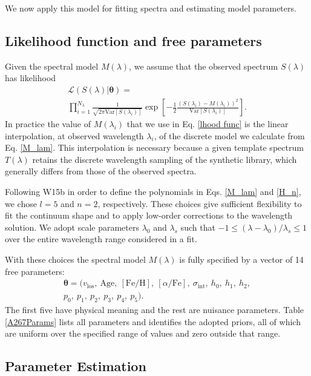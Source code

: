 \documentclass[twocolumn]{aastex6}
\def\feh{\mathrm{[Fe/H]}}
\def\afe{[\alpha/\mathrm{Fe}]}
\def\age{\mathrm{Age}}
\def\vlos{v_\mathrm{los}}
\def\disp{\sigma_\mathrm{int}}
\begin{document}
We now apply this model for fitting spectra and estimating model parameters.

\subsection{Likelihood function and free parameters}
\label{lhood}

Given the spectral model $M(\lambda)$, we assume that the observed spectrum $S(\lambda)$ has likelihood
\begin{multline}
\label{lhood func}
\mathcal{L}\left(S(\lambda)|\bm{\theta}\right)=\\
\prod^{N_\lambda}_{i=1}\frac{1}{\sqrt{2\pi\mathrm{Var}\left[S(\lambda_i)\right]}}\exp{\left[-\frac12\frac{\left(S(\lambda_i)-M(\lambda_i)\right)^2}{\mathrm{Var}\left[S(\lambda_i)\right]}\right]}.
\end{multline}
In practice the value of $M(\lambda_i)$ that we use in Eq. \ref{lhood func} is the linear interpolation, at observed wavelength $\lambda_i$, of the discrete model we calculate from Eq. \ref{M_lam}.
This interpolation is necessary because a given template spectrum $T(\lambda)$ retains the discrete wavelength sampling of the synthetic library, which generally differs from those of the observed spectra.

Following W15b in order to define the polynomials in Eqs. \ref{M_lam} and \ref{H_n}, we chose $l=5$ and $n=2$, respectively.
These choices give sufficient flexibility to fit the continuum shape and to apply low-order corrections to the wavelength solution.
We adopt scale parameters $\lambda_0$ and $\lambda_s$ such that $-1\le(\lambda-\lambda_0)/\lambda_s\le1$ over the entire wavelength range considered in a fit.

With these choices the spectral model $M(\lambda)$ is fully specified by a vector of 14 free parameters:
\begin{multline}
\label{theta}
\bm{\theta}=(\vlos,\ \age,\ \feh,\ \afe,\ \disp,\ h_0,\ h_1,\ h_2,\\
p_0,\ p_1,\ p_2,\ p_3,\ p_4,\ p_5).
\end{multline}
The first five have physical meaning and the rest are nuisance parameters.
Table \ref{A267Params} lists all parameters and identifies the adopted priors, all of which are uniform over the specified range of values and zero outside that range.

\subsection{Parameter Estimation}
\label{param est}
\end{document}
